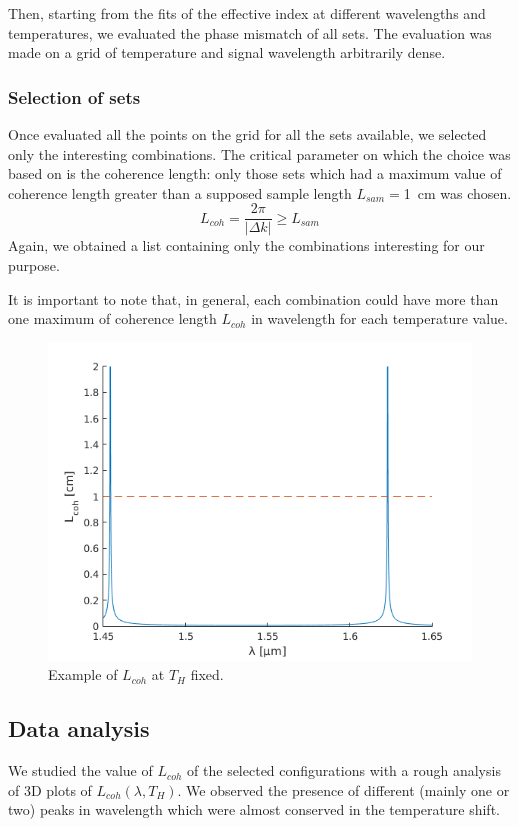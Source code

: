 \documentclass[12pt,a4paper,twoside]{article}
\begin{document}
Then, starting from the fits of the effective index at different wavelengths and temperatures, we evaluated the phase mismatch of all sets.
The evaluation was made on a grid of temperature and signal wavelength arbitrarily dense.

\subsubsection{Selection of sets}
Once evaluated all the points on the grid for all the sets available, we selected only the interesting combinations.
The critical parameter on which the choice was based on is the coherence length: only those sets which had a maximum value of coherence length greater than a supposed sample length $L_{sam} = $\SI{1}{\cm} was chosen.
\begin{equation}
	L_{coh} = \frac{2\pi}{|\Delta k|} \geq L_{sam}
	\label{eq_lcoh_crit}
\end{equation}
Again, we obtained a list containing only the combinations interesting for our purpose.

It is important to note that, in general, each combination could have more than one maximum of coherence length $L_{coh}$ in wavelength for each temperature value.

\begin{figure}[!h]
	\centering
	\includegraphics[width=.8\textwidth]{delta_example.png}
	\caption{Example of $L_{coh}$ at $T_H$ fixed.}
	\label{fig_peaks}
\end{figure}

\subsection{Data analysis}
We studied the value of $L_{coh}$ of the selected configurations with a rough analysis of 3D plots of $L_{coh}(\lambda,T_{H})$.
We observed the presence of different (mainly one or two) peaks in wavelength which were almost conserved in the temperature shift.
\end{document}
